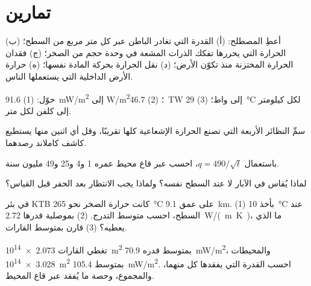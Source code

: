 \section{تمارين}

\begin{exercise}[$\star$]\label{exo:g12:internal-heat:1}
أعطِ المصطلح: (أ) القدرة التي تغادر الباطن عبر كل متر مربع
من السطح؛ (ب) الحرارة التي يحررها تفكك الذرات المشعة في وحدة
حجم من الصخر؛ (ج) فقدان الحرارة المختزنة منذ تكوّن الأرض؛
(د) نقل الحرارة بحركة المادة نفسها؛ (ه) حرارة الأرض
الداخلية التي يستعملها الناس.
\end{exercise}

\begin{exercise}[$\star$]\label{exo:g12:internal-heat:2}
حوّل: (1) \qty{91.6}{mW/m^2} إلى \unit{W/m^2}؛ (2) \qty{46.7}{TW} إلى
واط؛ (3) \qty{29}{\celsius} لكل كيلومتر إلى كلفن لكل متر.
\end{exercise}

\begin{exercise}[$\star$]\label{exo:g12:internal-heat:3}
سمِّ النظائر الأربعة التي تصنع الحرارة الإشعاعية كلها تقريبًا، وقل
أي اثنين منها يستطيع كاشف كاملاند رصدهما.
\end{exercise}

\begin{exercise}[$\star$]\label{exo:g12:internal-heat:4}
باستعمال $q = 490/\sqrt{t}$، احسب  عبر قاع محيط عمره 1 و4
و25 و49 مليون سنة.
\end{exercise}

\begin{exercise}[$\star$]\label{exo:g12:internal-heat:5}
لماذا يُقاس  في الآبار لا عند السطح نفسه؟
ولماذا يجب الانتظار بعد الحفر قبل القياس؟
\end{exercise}

\begin{exercise}[$\star\star$]\label{exo:g12:internal-heat:6}
في بئر KTB كانت حرارة الصخر نحو \qty{265}{\celsius} على عمق
\qty{9.1}{km}. (1) بأخذ \qty{10}{\celsius} عند السطح، احسب متوسط
التدرج. (2) بموصلية قدرها \qty{2.72}{W/(m.K)}، ما  الذي
يعطيه؟ (3) قارن بمتوسط القارات.
\end{exercise}

\begin{exercise}[$\star\star$]\label{exo:g12:internal-heat:7}
تغطي القارات \qty{2.073e14}{m^2} بمتوسط  قدره
\qty{70.9}{mW/m^2}، والمحيطات \qty{3.028e14}{m^2} بمتوسط
\qty{105.4}{mW/m^2}. احسب القدرة التي يفقدها كل منهما، والمجموع، وحصة
ما يُفقد عبر قاع المحيط.
\end{exercise}

